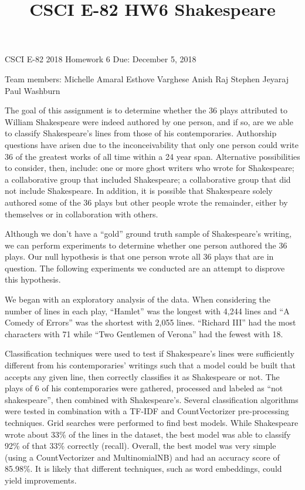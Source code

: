 \documentclass[11pt]{article}
\title{CSCI E-82 HW6 Shakespeare}
\begin{document}
    
    
    \maketitle
    
    

    
    CSCI E-82 2018 Homework 6 Due: December 5, 2018

Team members: Michelle Amaral Esthove Varghese Anish Raj Stephen Jeyaraj
Paul Washburn

The goal of this assignment is to determine whether the 36 plays
attributed to William Shakespeare were indeed authored by one person,
and if so, are we able to classify Shakespeare's lines from those of his
contemporaries. Authorship questions have arisen due to the
inconceivability that only one person could write 36 of the greatest
works of all time within a 24 year span. Alternative possibilities to
consider, then, include: one or more ghost writers who wrote for
Shakespeare; a collaborative group that included Shakespeare; a
collaborative group that did not include Shakespeare. In addition, it is
possible that Shakespeare solely authored some of the 36 plays but other
people wrote the remainder, either by themselves or in collaboration
with others.

Although we don't have a ``gold'' ground truth sample of Shakespeare's
writing, we can perform experiments to determine whether one person
authored the 36 plays. Our null hypothesis is that one person wrote all
36 plays that are in question. The following experiments we conducted
are an attempt to disprove this hypothesis.

We began with an exploratory analysis of the data. When considering the
number of lines in each play, ``Hamlet'' was the longest with 4,244
lines and ``A Comedy of Errors'' was the shortest with 2,055 lines.
``Richard III'' had the most characters with 71 while ``Two Gentlemen of
Verona'' had the fewest with 18.

Classification techniques were used to test if Shakespeare's lines were
sufficiently different from his contemporaries' writings such that a
model could be built that accepts any given line, then correctly
classifies it as Shakespeare or not. The plays of 6 of his
contemporaries were gathered, processed and labeled as ``not
shakespeare'', then combined with Shakespeare's. Several classification
algorithms were tested in combination with a TF-IDF and CountVectorizer
pre-processing techniques. Grid searches were performed to find best
models. While Shakespeare wrote about 33\% of the lines in the dataset,
the best model was able to classify 92\% of that 33\% correctly
(recall). Overall, the best model was very simple (using a
CountVectorizer and MultinomialNB) and had an accuracy score of 85.98\%.
It is likely that different techniques, such as word embeddings, could
yield improvements.
\end{document}

